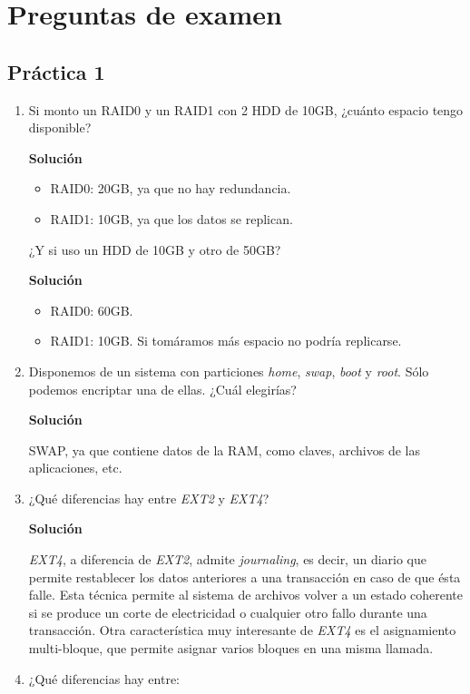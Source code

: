 \documentclass[12pt,spanish]{article}
\newenvironment{solution}{
	\par
	\textbf{Solución}
	\par
	\begin{center}
}
{
	\end{center}
}
\begin{document}
\newpage
\section{Preguntas de examen}
\subsection{Práctica 1}
\begin{enumerate}
  \item Si monto un RAID0 y un RAID1 con 2 HDD de 10GB, ¿cuánto espacio tengo disponible?
  \begin{solution}
    \begin{itemize}
      \item RAID0: 20GB, ya que no hay redundancia.
      \item RAID1: 10GB, ya que los datos se replican.
    \end{itemize}
  \end{solution}
  ¿Y si uso un HDD de 10GB y otro de 50GB?
  \begin{solution}
    \begin{itemize}
      \item RAID0: 60GB.
      \item RAID1: 10GB. Si tomáramos más espacio no podría replicarse.
    \end{itemize}
  \end{solution}
  \item Disponemos de un sistema con particiones \textit{home}, \textit{swap}, \textit{boot} y \textit{root}. Sólo podemos encriptar una de ellas. ¿Cuál elegirías?
  \begin{solution}
    SWAP, ya que contiene datos de la RAM, como claves, archivos de las aplicaciones, etc.
  \end{solution}
	\item ¿Qué diferencias hay entre \textit{EXT2} y \textit{EXT4}?
	\begin{solution}
		\textit{EXT4}, a diferencia de \textit{EXT2}, admite \textit{journaling}, es decir, un diario que permite restablecer los datos anteriores a una transacción en caso de que ésta falle. Esta técnica permite al sistema de archivos volver a un estado coherente si se produce un corte de electricidad o cualquier otro fallo durante una transacción. Otra característica muy interesante de \textit{EXT4} es el asignamiento multi-bloque, que permite asignar varios bloques en una misma llamada.
	\end{solution}
	\item ¿Qué diferencias hay entre:

\end{enumerate}
\end{document}
